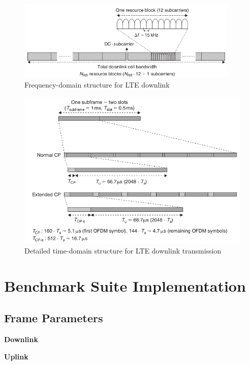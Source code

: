 \documentclass[titlepage]{article}
\numberwithin{figure}{section}
\numberwithin{equation}{section}
\begin{document}
\begin{figure}[htbp]
	\centering
	\includegraphics[height=1.5in]{DL-Frequency}
	\caption{Frequency-domain structure for LTE downlink}
\end{figure}

\begin{figure}[htbp]\label{fig:DL-Time}
	\centering
	\includegraphics[height=3in]{DL-Time}
	\caption{Detailed time-domain structure for LTE downlink transmission}
\end{figure}

\section{Benchmark Suite Implementation}

\subsection{Frame Parameters}

\textbf{Downlink}

\textbf{Uplink}
\end{document}
